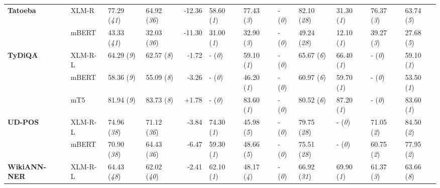 \begin{tabular}{ll||llr|lllllll}
	\multirow{2}{*}{\textbf{Tatoeba}\acc} & XLM-R & 77.29 (\textit{41}) & 64.92 (\textit{36}) & -12.36 & \cellcolor{low-color!40}  58.60 (\textit{1}) &  77.43 (\textit{3}) & - (\textit{0}) & \cellcolor{high-color!40}  82.10 (\textit{28}) & \cellcolor{low-color!40}  31.30 (\textit{1}) &  76.37 (\textit{3}) &  63.74 (\textit{5}) \\
	 & mBERT & 43.33 (\textit{41}) & 32.03 (\textit{36}) & -11.30 & \cellcolor{low-color!40}  31.00 (\textit{1}) &  32.90 (\textit{3}) & - (\textit{0}) & \cellcolor{high-color!40}  49.24 (\textit{28}) & \cellcolor{low-color!40}  12.10 (\textit{1}) &  39.27 (\textit{3}) &  27.68 (\textit{5}) \\\midrule
	\multirow{3}{*}{\textbf{TyDiQA}\f} & XLM-R-L & 64.29 (\textit{9}) & 62.57 (\textit{8}) & -1.72 & - (\textit{0}) & \cellcolor{low-color!40}  59.10 (\textit{1}) & - (\textit{0}) & \cellcolor{high-color!40}  65.67 (\textit{6}) & \cellcolor{low-color!40}  66.40 (\textit{1}) & - (\textit{0}) & \cellcolor{low-color!40}  59.10 (\textit{1}) \\
	 & mBERT & 58.36 (\textit{9}) & 55.09 (\textit{8}) & -3.26 & - (\textit{0}) & \cellcolor{low-color!40}  46.20 (\textit{1}) & - (\textit{0}) & \cellcolor{high-color!40}  60.97 (\textit{6}) & \cellcolor{low-color!40}  59.70 (\textit{1}) & - (\textit{0}) & \cellcolor{low-color!40}  53.50 (\textit{1}) \\
	 & mT5 & 81.94 (\textit{9}) & 83.73 (\textit{8}) & +1.78 & - (\textit{0}) & \cellcolor{low-color!40}  83.60 (\textit{1}) & - (\textit{0}) & \cellcolor{high-color!40}  80.52 (\textit{6}) & \cellcolor{low-color!40}  87.20 (\textit{1}) & - (\textit{0}) & \cellcolor{low-color!40}  83.60 (\textit{1}) \\\midrule
	\multirow{2}{*}{\textbf{UD-POS}\f} & XLM-R-L & 74.96 (\textit{38}) & 71.12 (\textit{36}) & -3.84 & \cellcolor{low-color!40}  74.30 (\textit{1}) &  45.98 (\textit{5}) & - (\textit{0}) & \cellcolor{high-color!40}  79.75 (\textit{28}) & - (\textit{0}) &  71.05 (\textit{2}) &  84.50 (\textit{2}) \\
	 & mBERT & 70.90 (\textit{38}) & 64.43 (\textit{36}) & -6.47 & \cellcolor{low-color!40}  59.30 (\textit{1}) &  48.66 (\textit{5}) & - (\textit{0}) & \cellcolor{high-color!40}  75.51 (\textit{28}) & - (\textit{0}) &  60.75 (\textit{2}) &  77.95 (\textit{2}) \\\midrule
	\multirow{2}{*}{\textbf{WikiANN-NER}\f} & XLM-R-L & 64.43 (\textit{48}) & 62.02 (\textit{40}) & -2.41 & \cellcolor{low-color!40}  62.10 (\textit{1}) &  48.17 (\textit{4}) & - (\textit{0}) & \cellcolor{high-color!40}  66.92 (\textit{31}) & \cellcolor{low-color!40}  69.90 (\textit{1}) &  61.37 (\textit{3}) &  63.66 (\textit{8}) \\

\end{tabular}
